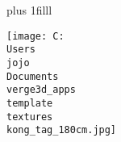 \documentclass{photobook} %
\begin{document}
\maketitle
\pagestyle{empty}
\begin{minipage}{\imgwidth}%
\drawtrimcorners%
\vskip0pt plus 1filll
\begin{minipage}{\imgwidth}%
 \hfil\texttt{[image: C:\\Users\\jojo\\Documents\\verge3d\_apps\\template\\textures\\kong\_tag\_180cm.jpg]}\hfil
\end{minipage}
\end{minipage}
\newpage
\end{document}

